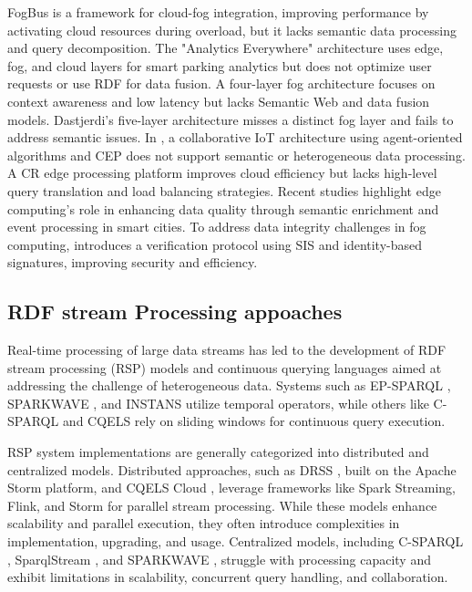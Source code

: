 \documentclass[5p,times]{elsarticle}
\begin{document}
 
FogBus \cite{TULI201922} is a framework for cloud-fog integration, improving performance by 
activating cloud resources during overload, but it lacks semantic data processing and query 
decomposition. The "Analytics Everywhere" architecture \cite{article63} uses edge, fog, and cloud layers
 for smart parking analytics but does not optimize user requests or use RDF for data fusion. A four-layer
  fog architecture \cite{Arkian2017} focuses on context awareness and low latency but 
  lacks Semantic Web and data fusion models. Dastjerdi's five-layer architecture \cite{Dastjerdi2016} misses a distinct 
  fog layer and fails to address semantic issues. In \cite{ortiz2022atmosphere}, a collaborative IoT architecture using agent-oriented algorithms
   and CEP does not support semantic or heterogeneous data processing. A CR edge processing platform \cite{bonte2023towards} improves
    cloud efficiency but lacks high-level query translation and load balancing strategies. Recent studies \cite{XHAFA2020730} highlight edge computing’s role
     in enhancing data quality through semantic enrichment and event processing in smart cities. To address data integrity challenges in fog computing, \cite{SELLAMI202464} 
     introduces a verification protocol using SIS and identity-based signatures, improving security and efficiency.



\subsection{RDF stream Processing appoaches}


Real-time processing of large data streams has led to the development of RDF stream processing (RSP) models
 and continuous querying languages aimed at addressing the challenge of heterogeneous data. Systems such
  as EP-SPARQL \cite{anicic2011ep}, SPARKWAVE \cite{komazec2012sparkwave}, and INSTANS \cite{rinne2012instans} utilize temporal operators,
   while others like C-SPARQL \cite{barbieri2010c} and CQELS \cite{le2011native} rely on sliding windows for continuous query execution.

RSP system implementations are generally categorized into distributed and centralized models. Distributed approaches, such as DRSS \cite{dia2018drss},
 built on the Apache Storm platform, and CQELS Cloud \cite{le2013elastic}, leverage frameworks like Spark Streaming,
  Flink, and Storm for parallel stream processing. While these models enhance scalability and parallel execution,
   they often introduce complexities in implementation, upgrading, and usage. Centralized models, including
    C-SPARQL \cite{barbieri2010c}, SparqlStream \cite{calbimonte2010enabling}, and SPARKWAVE \cite{komazec2012sparkwave}, 
    struggle with processing capacity and exhibit limitations in scalability, concurrent query handling, and collaboration.
\end{document}
